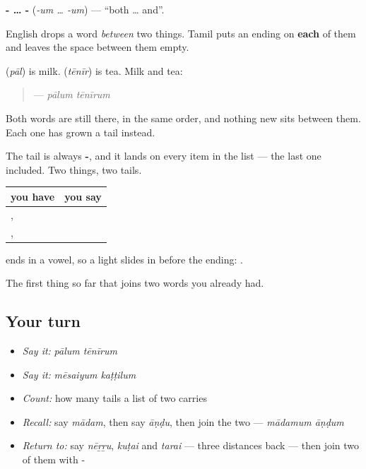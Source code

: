 \begin{grammarlens}[title={Grammar lens: no word goes between them}]
\textbf{- … -} (\emph{-um … -um}) — \textquotedblleft{}both … and\textquotedblright{}.

English drops a word \emph{between} two things. Tamil puts an ending on \textbf{each} of them and leaves the space between them empty.

 (\emph{pāl}) is milk.  (\emph{tēnīr}) is tea. Milk and tea:

\begin{quote}
\textbf{ } — \emph{pālum tēnīrum}
\end{quote}

Both words are still there, in the same order, and nothing new sits between them. Each one has grown a tail instead.

The tail is always \textbf{-}, and it lands on every item in the list — the last one included. Two things, two tails.

\noindent
\begin{tabularx}{\linewidth}{@{}>{\raggedright\arraybackslash}X>{\raggedright\arraybackslash}X@{}}
\toprule
\textbf{you have} & \textbf{you say} \\
\midrule
\ta{பால்}, \ta{தேநீர்} & \textbf{\ta{பாலும்} \ta{தேநீரும்}} \\
\ta{மேசை}, \ta{கட்டில்} & \textbf{\ta{மேசையும்} \ta{கட்டிலும்}} \\
\bottomrule
\end{tabularx}

 ends in a vowel, so a light \textbf{} slides in before the ending: \textbf{}.
\end{grammarlens}

\begin{grammarlens}[title={What you've built}]
The first thing so far that joins two words you already had.
\end{grammarlens}

\subsection*{Your turn}
\begin{itemize}
\raggedright
  \item \emph{Say it:} \emph{pālum tēnīrum}
  \item \emph{Say it:} \emph{mēsaiyum kaṭṭilum}
  \item \emph{Count:} how many tails a list of two carries
  \item \emph{Recall:} say \emph{mādam}, then say \emph{āṇḍu}, then join the two — \emph{mādamum āṇḍum}
  \item \emph{Return to:} say \emph{nēṟṟu}, \emph{kuṭai} and \emph{tarai} — three distances back — then join two of them with -
\end{itemize}

